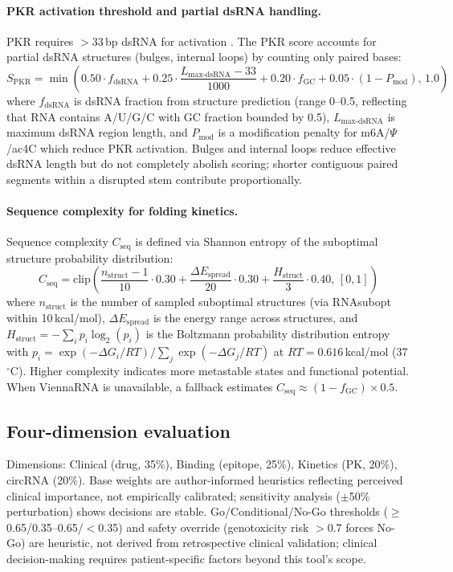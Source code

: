 \paragraph{PKR activation threshold and partial dsRNA handling.}
PKR requires $>$33\,bp dsRNA for activation \citep{nallagatla2007}. The PKR score accounts for partial dsRNA structures (bulges, internal loops) by counting only paired bases:
\begin{equation}
S_{\text{PKR}} = \min\left( 0.50 \cdot f_{\text{dsRNA}} + 0.25 \cdot \frac{L_{\text{max-dsRNA}} - 33}{1000} + 0.20 \cdot f_{\text{GC}} + 0.05 \cdot (1 - P_{\text{mod}}), \, 1.0 \right)
\end{equation}
where $f_{\text{dsRNA}}$ is dsRNA fraction from structure prediction (range 0--0.5, reflecting that RNA contains A/U/G/C with GC fraction bounded by 0.5), $L_{\text{max-dsRNA}}$ is maximum dsRNA region length, and $P_{\text{mod}}$ is a modification penalty for m6A/$\Psi$/ac4C which reduce PKR activation. Bulges and internal loops reduce effective dsRNA length but do not completely abolish scoring; shorter contiguous paired segments within a disrupted stem contribute proportionally.

\paragraph{Sequence complexity for folding kinetics.}
Sequence complexity $C_{\text{seq}}$ is defined via Shannon entropy of the suboptimal structure probability distribution:
\begin{equation}
C_{\text{seq}} = \text{clip}\left( \frac{n_{\text{struct}} - 1}{10} \cdot 0.30 + \frac{\Delta E_{\text{spread}}}{20} \cdot 0.30 + \frac{H_{\text{struct}}}{3} \cdot 0.40, \, [0, 1] \right)
\end{equation}
where $n_{\text{struct}}$ is the number of sampled suboptimal structures (via RNAsubopt within 10\,kcal/mol), $\Delta E_{\text{spread}}$ is the energy range across structures, and $H_{\text{struct}} = -\sum_i p_i \log_2(p_i)$ is the Boltzmann probability distribution entropy with $p_i = \exp(-\Delta G_i / RT)/\sum_j \exp(-\Delta G_j / RT)$ at $RT=0.616$\,kcal/mol (37$^\circ$C). Higher complexity indicates more metastable states and functional potential. When ViennaRNA is unavailable, a fallback estimates $C_{\text{seq}} \approx (1 - f_{\text{GC}}) \times 0.5$.

\subsection*{Four-dimension evaluation}
Dimensions: Clinical (drug, 35\%), Binding (epitope, 25\%), Kinetics (PK, 20\%), circRNA (20\%). Base weights are author-informed heuristics reflecting perceived clinical importance, not empirically calibrated; sensitivity analysis ($\pm$50\% perturbation) shows decisions are stable. Go/Conditional/No-Go thresholds ($\geq$0.65/0.35--0.65/$<$0.35) and safety override (genotoxicity risk $>$0.7 forces No-Go) are heuristic, not derived from retrospective clinical validation; clinical decision-making requires patient-specific factors beyond this tool's scope.


